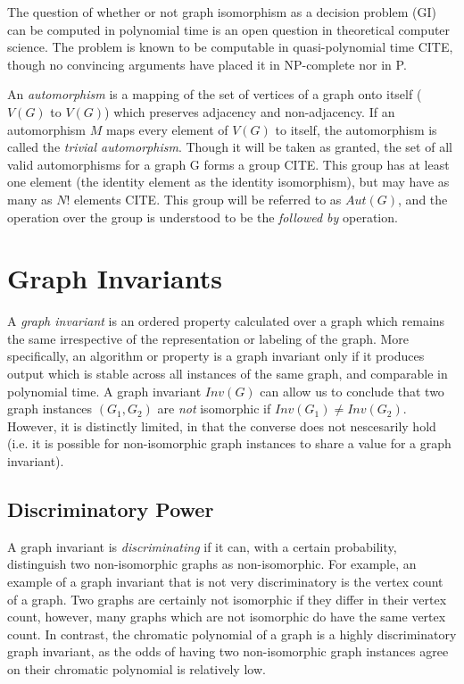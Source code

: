 \documentclass[11pt,a4paper]{report}
\begin{document}
The question of whether or not graph isomorphism as a decision problem (GI) can be computed in polynomial time is an open question in theoretical computer science.
The problem is known to be computable in quasi-polynomial time CITE, though no convincing arguments have placed it in NP-complete nor in P.

An \emph{automorphism} is a mapping of the set of vertices of a graph onto itself ($V(G)$ to $V(G)$) which preserves adjacency and non-adjacency.
If an automorphism $M$ maps every element of $V(G)$ to itself, the automorphism is called the \emph{trivial automorphism}.
Though it will be taken as granted, the set of all valid automorphisms for a graph G forms a group CITE.
This group has at least one element (the identity element as the identity isomorphism), but may have as many as $N!$ elements CITE.
This group will be referred to as $Aut(G)$, and the operation over the group is understood to be the \emph{followed by} operation.

\section{Graph Invariants}
A \emph{graph invariant} is an ordered property calculated over a graph which remains the same irrespective of the representation or labeling of the graph.
More specifically, an algorithm or property is a graph invariant only if it produces output which is stable across all instances of the same graph, and comparable in polynomial time.
A graph invariant $Inv(G)$ can allow us to conclude that two graph instances $(G_1, G_2)$ are \emph{not} isomorphic if $Inv(G_1) \neq Inv(G_2)$.
However, it is distinctly limited, in that the converse does not nescesarily hold (i.e. it is possible for non-isomorphic graph instances to share a value for a graph invariant).

\subsection{Discriminatory Power}
A graph invariant is \emph{discriminating} if it can, with a certain probability, distinguish two non-isomorphic graphs as non-isomorphic.
For example, an example of a graph invariant that is not very discriminatory is the vertex count of a graph.
Two graphs are certainly not isomorphic if they differ in their vertex count, however, many graphs which are not isomorphic do have the same vertex count.
In contrast, the chromatic polynomial of a graph is a highly discriminatory graph invariant, as the odds of having two non-isomorphic graph instances agree on their chromatic polynomial is relatively low.
\end{document}
